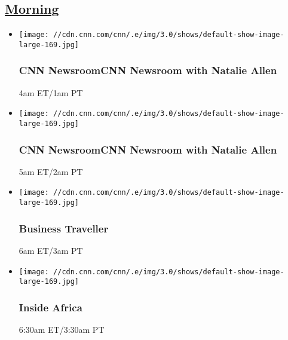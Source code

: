 \hypertarget{morning--1}{%
\subsection{\texorpdfstring{\href{/tv/schedule/cnn/index.html}{Morning}~}{Morning~}}\label{morning--1}}

\begin{itemize}
\item
  \texttt{[image: //cdn.cnn.com/cnn/.e/img/3.0/shows/default-show-image-large-169.jpg]}

  \hypertarget{cnn-newsroomcnn-newsroom-with-natalie-allen--3}{%
  \subsubsection{CNN NewsroomCNN Newsroom with Natalie Allen
  }\label{cnn-newsroomcnn-newsroom-with-natalie-allen--3}}

  4am ET/1am PT
\end{itemize}

\begin{itemize}
\item
  \texttt{[image: //cdn.cnn.com/cnn/.e/img/3.0/shows/default-show-image-large-169.jpg]}

  \hypertarget{cnn-newsroomcnn-newsroom-with-natalie-allen--4}{%
  \subsubsection{CNN NewsroomCNN Newsroom with Natalie Allen
  }\label{cnn-newsroomcnn-newsroom-with-natalie-allen--4}}

  5am ET/2am PT
\end{itemize}

\begin{itemize}
\item
  \texttt{[image: //cdn.cnn.com/cnn/.e/img/3.0/shows/default-show-image-large-169.jpg]}

  \hypertarget{business-traveller-1}{%
  \subsubsection{Business Traveller}\label{business-traveller-1}}

  6am ET/3am PT
\end{itemize}

\begin{itemize}
\item
  \texttt{[image: //cdn.cnn.com/cnn/.e/img/3.0/shows/default-show-image-large-169.jpg]}

  \hypertarget{inside-africa-4}{%
  \subsubsection{Inside Africa}\label{inside-africa-4}}

  6:30am ET/3:30am PT
\end{itemize}

